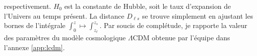 respectivement. 
$H_0$ est la constante de Hubble, soit le taux 
d'expansion de l'Univers au temps présent. La distance $D_{\ell s}$ se trouve simplement en ajustant les bornes de l'intégrale $\int_0^{z} \mapsto \int_{z_\ell}^{z_s}$.
Par soucis de complétude, 
je rapporte la valeur des paramètres du modèle cosmologique $\Lambda$CDM obtenue par l'équipe \citet{PlanckCollaboration2018}
dans l'annexe \ref{app:lcdm}.

